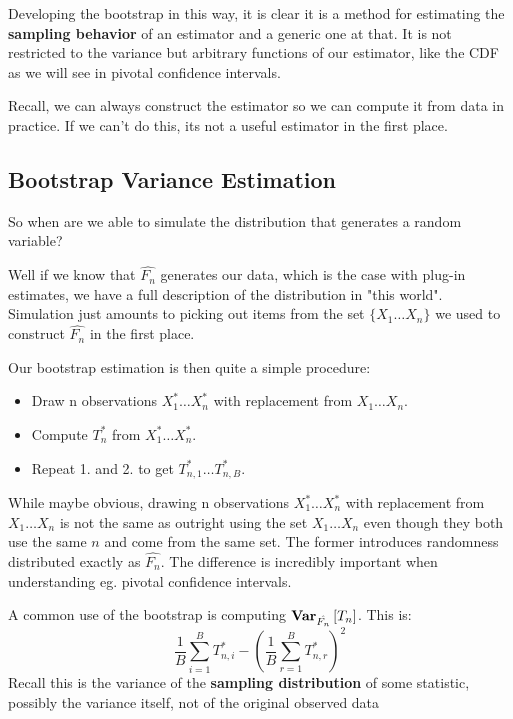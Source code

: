 \documentclass[10pt]{article}
\begin{document}
\begin{note}
Developing the bootstrap in this way, it is clear it is a method for estimating
the \textbf{sampling behavior} of an estimator and a generic one at that. It is
not restricted to the variance but arbitrary functions of our estimator, like
the CDF as we will see in pivotal confidence intervals.

Recall, we can always construct the estimator so we can compute it from data in
practice. If we can't do this, its not a useful estimator in the first place.
\end{note}

\subsection{Bootstrap Variance Estimation}

So when are we able to simulate the distribution that generates a random
variable? 

Well if we know that $\hat{F_n}$ generates our data, which is the case with
plug-in estimates, we have a full description of the distribution in "this
world".  Simulation just amounts to picking out items from the set $\{X_1 \dots
X_n\}$ we used to construct $\hat{F_n}$ in the first place.

Our bootstrap estimation is then quite a simple procedure:

\begin{definition}
    \begin{itemize}
        \item{Draw n observations $X^*_1 \dots X^*_n$ with replacement from $X_1 \dots X_n$.}
        \item{Compute $T^*_n$ from $X^*_1 \dots X^*_n$.}
        \item{Repeat 1. and 2. to get $T^*_{n, 1} \dots T^*_{n, B}$.}
    \end{itemize}
\end{definition}

While maybe obvious, drawing n observations $X^*_1 \dots X^*_n$ with
replacement from $X_1 \dots X_n$ is not the same as outright using the set $X_1
\dots X_n$ even though they both use the same $n$ and come from the same set.
The former introduces randomness distributed exactly as $\hat{F_n}$. The
difference is incredibly important when understanding eg. pivotal confidence
intervals.

\begin{note}
    A common use of the bootstrap is computing $\Var[\hat{F_n}]{T_n}$. This is:
    \[ \frac{1}{B}\sum_{i=1}^B T^*_{n, i} - (\frac{1}{B}\sum_{r=1}^B T^*_{n, r})^2\]
    Recall this is the variance of the \textbf{sampling distribution} of some statistic,
    possibly the variance itself, not of the original observed data
\end{note}
\end{document}
